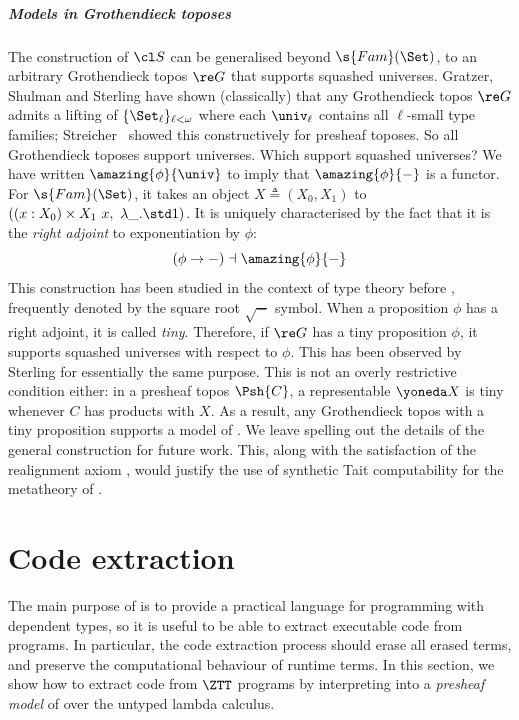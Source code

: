 \subparagraph{Models in Grothendieck toposes} \label{ssub:mod-gro}

The construction of $\cl S$ can be generalised beyond
$\s{Fam}(\Set)$, to an arbitrary Grothendieck topos $\re G$ that supports
squashed universes. Gratzer, Shulman and Sterling \cite{Gratzer2022-gn} have
shown (classically) that any Grothendieck topos $\re G$ admits a lifting of
$\{\Set_\ell\}_{\ell < \omega}$ where each $\univ_\ell$ contains all
$\ell$-small type families; Streicher~\cite{Streicher2005-tm} showed this
constructively for presheaf toposes. So all Grothendieck toposes support
universes. Which support squashed universes? We have written
$\amazing{\phi}{\univ}$ to imply that $\amazing{\phi}{-}$ is a functor. For
$\s{Fam}(\Set)$, it takes an object $X \triangleq (X_0, X_1)$ to $((x : X_0)
\times X_1\ x,\ \lambda\_.\std 1)$. It is uniquely characterised by the fact
that it is the \emph{right adjoint} to exponentiation by $\phi$:
$$
(\phi \to -) \dashv \amazing{\phi}{-}
$$
This construction has been studied in the context of type theory before
\cite{Licata2018-fe,Nuyts2020-pu,Sterling2021-kp,Riley2024-zk}, frequently
denoted by the square root $\sqrt{-}$ symbol. When a proposition $\phi$ has a
right adjoint, it is called \emph{tiny}. Therefore, if $\re G$ has a tiny
proposition $\phi$, it supports squashed universes with respect to $\phi$. This
has been observed by Sterling \cite{Sterling2023-jx} for essentially the same
purpose. This is not an overly restrictive condition either: in a presheaf topos
$\Psh{C}$, a representable $\yoneda X$ is tiny whenever $C$ has products
with $X$. As a result, any Grothendieck topos with a tiny proposition supports a
model of \ZTT. We leave spelling out the details of the general construction for
future work. This, along with the satisfaction of the realignment axiom
\cite{Gratzer2022-gn}, would justify the use of synthetic Tait computability
\cite{Sterling2022-ym} for the metatheory of \ZTT.


\section{Code extraction}\label{sub:code-extr}

The main purpose of \ZTT is to provide a practical language for programming with
dependent types, so it is useful to be able to extract executable code from \ZTT
programs. In particular, the code extraction process should erase all erased
terms, and preserve the computational behaviour of runtime terms. In this
section, we show how to extract code from $\ZTT$ programs by interpreting into a
\emph{presheaf model} of \ZTT over the untyped lambda calculus.

